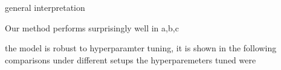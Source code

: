         general interpretation

        Our method performs surprisingly well in a,b,c
        
        the model is robust to hyperparamter tuning, it is shown in the following comparisons under different setups 
        the hyperparemeters tuned were

    


        
        
        
    
